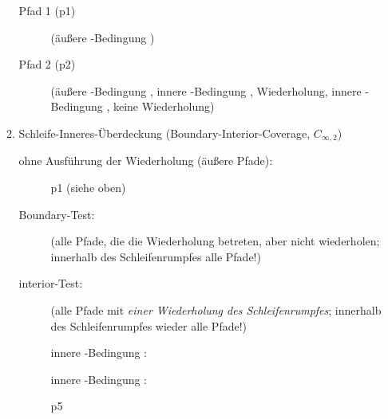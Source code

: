 \documentclass{bschlangaul-aufgabe}
\begin{document}
\begin{enumerate}
\begin{enumerate}
\begin{bAntwort}
\begin{description}
\item[Pfad 1 (p1)]

\TmpPfadEins

(äußere -Bedingung )

\item[Pfad 2 (p2)]

\TmpPfadZwei

(äußere -Bedingung , innere -Bedingung
, Wiederholung, innere -Bedingung , keine
Wiederholung)
\end{description}

\end{bAntwort}


\item Schleife-Inneres-Überdeckung (Boundary-Interior-Coverage,
$C_{\infty,2}$)

\begin{bAntwort}
\begin{description}
\item[ohne Ausführung der Wiederholung (äußere Pfade):]

p1 (siehe oben) \TmpPfadEins

\item[Boundary-Test:]

(alle Pfade, die die Wiederholung betreten, aber nicht wiederholen; innerhalb des
Schleifenrumpfes alle Pfade!)

\item[interior-Test:]

(alle Pfade mit \emph{einer Wiederholung des Schleifenrumpfes};
innerhalb des Schleifenrumpfes wieder alle Pfade!)

\def\TmpWahr{innere \bJavaCode{if}-Bedingung \bJavaCode{true}}
\def\TmpFalsch{innere -Bedingung }

\TmpWahr: 

\TmpFalsch: 

\begin{description}
\item[p5]



\end{description}
\end{description}
\end{bAntwort}
\end{enumerate}
\end{enumerate}
\end{document}
